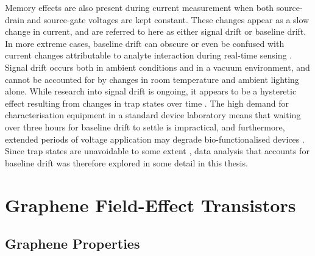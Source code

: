 \documentclass[
  a4paper,
]{scrbook}
\begin{document}
Memory effects are also present during current measurement when both
source-drain and source-gate voltages are kept constant. These changes
appear as a slow change in current, and are referred to here as either
signal drift or baseline drift. In more extreme cases, baseline drift
can obscure or even be confused with current changes attributable to
analyte interaction during real-time sensing \autocite{Noyce2019}.
Signal drift occurs both in ambient conditions and in a vacuum
environment, and cannot be accounted for by changes in room temperature
and ambient lighting alone. While research into signal drift is ongoing,
it appears to be a hysteretic effect resulting from changes in trap
states over time \autocite{Lin2006,Bargaoui2018,Noyce2019}. The high
demand for characterisation equipment in a standard device laboratory
means that waiting over three hours for baseline drift to settle is
impractical, and furthermore, extended periods of voltage application
may degrade bio-functionalised devices \autocite{Noyce2019}. Since trap
states are unavoidable to some extent
\autocite{DiMaria1993,Collins2000}, data analysis that accounts for
baseline drift was therefore explored in some detail in this thesis.

\hypertarget{graphene-field-effect-transistors}{%
\section{Graphene Field-Effect
Transistors}\label{graphene-field-effect-transistors}}

\hypertarget{graphene-properties}{%
\subsection{Graphene Properties}\label{graphene-properties}}
\end{document}
